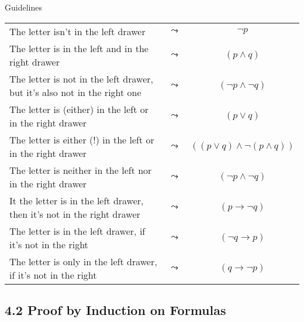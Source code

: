 \begin{frame}{Guidelines}

\begin{tabular}{p{6cm} c c}
	The letter \alert{isn't} in the left drawer & $\leadsto$ & $\neg p$\\[1ex]
	The letter is in the left \alert{and} in the right drawer & $\leadsto$ & $(p\land q)$\\[1ex]
	The letter is not in the left drawer, \alert{but} it's also not in the right one & $\leadsto$ & $(\neg p\land \neg q)$\\[1ex]
	The letter is (\alert{either}) in the left \alert{or} in the right drawer & $\leadsto$ & $(p\lor q)$\\[1ex]
	The letter is \alert{either} (!) in the left \alert{or} in the right drawer & $\leadsto$ & $((p\lor q)\land \neg(p\land q))$\\[1ex]
	The letter is \alert{neither} in the left \alert{nor} in the right drawer  & $\leadsto$ & $(\neg p\land \neg q)$\\[1ex]
	It the letter is in the left drawer, \alert{then} it's not in the right drawer & $\leadsto$ & $(p\to \neg q)$\\[1ex]
	The letter is in the left drawer, \alert{if} it's not in the right & $\leadsto$ & $(\neg q\to p)$\\[1ex]
	The letter is \alert{only} in the left drawer, \alert{if} it's not in the right & $\leadsto$ & $(q\to \neg p)$\\
	\end{tabular}

\end{frame}
		
\subsection{4.2 Proof by Induction on Formulas}

